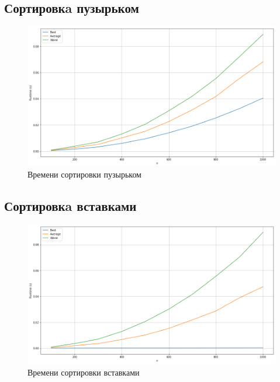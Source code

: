\pagebreak
\subsection{Сортировкa пузырьком}
\begin{figure}[h!]
    \centering
    \includegraphics[width=1\textwidth]{3/inc/p1.png}
    \caption{Времени сортировки пузырьком}
\end{figure}

\subsection{Сортировкa вставками}
\begin{figure}[h!]
    \centering
    \includegraphics[width=1\textwidth]{3/inc/p2.png}
    \caption{Времени сортировки вставками}
\end{figure}

